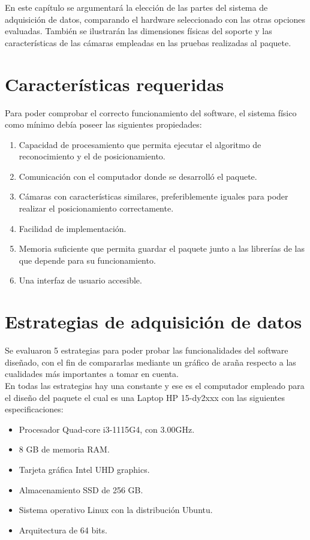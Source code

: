 En este capítulo se argumentará la elección de las partes del sistema de adquisición de datos, comparando el hardware seleccionado con las otras opciones evaluadas. También se ilustrarán las dimensiones físicas del soporte y las características de las cámaras empleadas en las pruebas realizadas al paquete.
\section{Características requeridas}
Para poder comprobar el correcto funcionamiento del software, el sistema físico como mínimo debía poseer las siguientes propiedades:
\begin{enumerate}
    \item Capacidad de procesamiento que permita ejecutar el algoritmo de reconocimiento y el de posicionamiento.
    \item Comunicación con el computador donde se desarrolló el paquete.
    \item Cámaras con características similares, preferiblemente iguales para poder realizar el posicionamiento correctamente.
    \item Facilidad de implementación. 
    \item Memoria suficiente que permita guardar el paquete junto a las librerías de las que depende para su funcionamiento.
    \item Una interfaz de usuario accesible.
\end{enumerate}
\section{Estrategias de adquisición de datos}
Se evaluaron 5 estrategias para poder probar las funcionalidades del software diseñado, con el fin de compararlas mediante un gráfico de araña respecto a las cualidades más importantes a tomar en cuenta. 
\\
En todas las estrategias hay una constante y ese es el computador empleado para el diseño del paquete el cual es una Laptop HP 15-dy2xxx con las siguientes especificaciones:
\begin{itemize}
    \item Procesador Quad-core i3-1115G4, con 3.00GHz.  
    \item 8 GB de memoria RAM.
    \item Tarjeta gráfica Intel UHD graphics.
    \item Almacenamiento SSD de 256 GB.
    \item Sistema operativo Linux con la distribución Ubuntu.
    \item Arquitectura de 64 bits.
\end{itemize}
